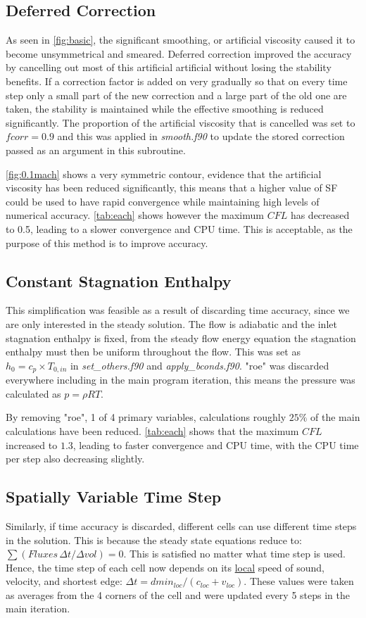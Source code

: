 \documentclass[12pt, a4paper]{article}
\begin{document}
\subsection{Deferred Correction}
As seen in \autoref{fig:basic}, the significant smoothing, or artificial viscosity caused it to become unsymmetrical and smeared. Deferred correction improved the accuracy by cancelling out most of this artificial artificial without losing the stability benefits. If a correction factor is added on very gradually so that on every time step only a small part of the new correction and a large part of the old one are taken, the stability is maintained while the effective smoothing is reduced significantly.
The proportion of the artificial viscosity that is cancelled was set to $fcorr=0.9$ and this was applied in \textit{smooth.f90} to update the stored correction passed as an argument in this subroutine.

\autoref{fig:0.1mach} shows a very symmetric contour, evidence that the artificial viscosity has been reduced significantly, this means that a higher value of SF could be used to have rapid convergence while maintaining high levels of numerical accuracy. \autoref{tab:each} shows however the maximum $CFL$ has decreased to 0.5, leading to a slower convergence and CPU time. This is acceptable, as the purpose of this method is to improve accuracy.

\subsection{Constant Stagnation Enthalpy}
This simplification was feasible as a result of discarding time accuracy, since we are only interested in the steady solution. The flow is adiabatic and the inlet stagnation enthalpy is fixed, from the steady flow energy equation the stagnation enthalpy must then be uniform throughout the flow. This was set as $h_0=c_p\times T_{0,in}$ in \textit{set\_others.f90} and \textit{apply\_bconds.f90}. "roe" was discarded everywhere including in the main program iteration, this means the pressure was calculated as $p=\rho R T$.

By removing "roe", 1 of 4 primary variables, calculations roughly $25\%$ of the main calculations have been reduced. \autoref{tab:each} shows that the maximum $CFL$ increased to $1.3$, leading to faster convergence and CPU time, with the CPU time per step also decreasing slightly.

\subsection{Spatially Variable Time Step}
Similarly, if time accuracy is discarded, different cells can use different time steps in the solution. This is because the steady state equations reduce to: $\sum (Fluxes\,\Delta t/\Delta vol)=0$. This is satisfied no matter what time step is used. Hence, the time step of each cell now depends on its \underline{local} speed of sound, velocity, and shortest edge: $\Delta t=dmin_{loc}/(c_{loc}+v_{loc})$. These values were taken as averages from the 4 corners of the cell and were updated every 5 steps in the main iteration. 
\end{document}
